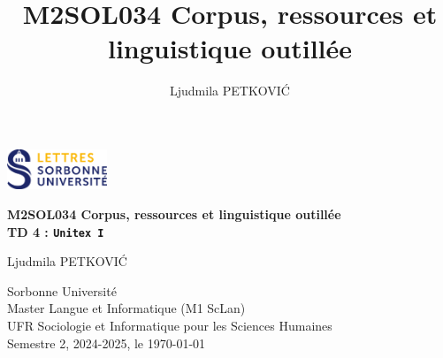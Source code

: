\documentclass[xcolor={table,usenames,dvipsnames}]{article}
\author{Ljudmila PETKOVI\'C}
\title{\textbf{\textsc{M2SOL034} Corpus, ressources et linguistique outillée}}
\begin{document}
	
	\begin{center}
		\includegraphics[width=3cm]{img/logo.png} %
	\end{center}
	
	\begin{tcolorbox}[colback=myblue!10, colframe=myblue, width=\textwidth, sharp corners, boxrule=1pt]
		\centering
		\Large \textbf{\textsc{M2SOL034} Corpus, ressources et linguistique outillée\\{\large\textsc{TD 4} : \texttt{Unitex I}}}
	\end{tcolorbox}
	
	\begin{center}
		Ljudmila PETKOVI\'C
		
		{\small Sorbonne Université\\Master \og{}Langue et Informatique\fg{} (\textsc{M1} ScLan)\\\textsc{UFR} Sociologie et Informatique pour les Sciences Humaines\\Semestre 2, 2024-2025, le \today}
	\end{center}
	


		
	\tableofcontents
	
	\bigskip
	
\end{document}
